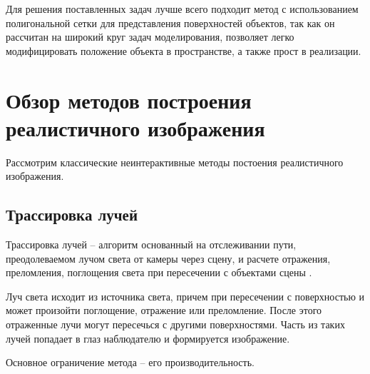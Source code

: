 Для решения поставленных задач лучше всего подходит метод с использованием полигональной сетки для представления поверхностей объектов, так как он рассчитан на широкий круг задач моделирования, позволяет легко модифицировать положение объекта в пространстве, а также прост в реализации.

\section{Обзор методов построения реалистичного изображения}

Рассмотрим классические неинтерактивные методы постоения реалистичного изображения.

\subsection{Трассировка лучей}

Трассировка лучей -- алгоритм основанный на отслеживании пути, преодолеваемом лучом света от камеры через сцену, и расчете отражения, преломления, поглощения света при пересечении с объектами сцены \cite{ray-tracing}.

Луч света исходит из источника света, причем при пересечении с поверхностью и может произойти поглощение, отражение или преломление. После этого отраженные лучи могут пересечься с другими поверхностями. Часть из таких лучей попадает в глаз наблюдателю и формируется изображение.

Основное ограничение метода -- его производительность.


